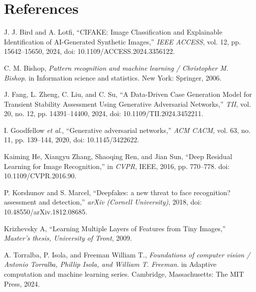 \documentclass{article}
\begin{document}
\section{References}
\begin{enumerate}[label={[\arabic*]}]
    \item J. J. Bird and A. Lotfi, “CIFAKE: Image Classification and Explainable Identification of AI-Generated Synthetic Images,” \textit{IEEE ACCESS}, vol. 12, pp. 15642–15650, 2024, doi: 10.1109/ACCESS.2024.3356122.
    \item C. M. Bishop, \textit{Pattern recognition and machine learning / Christopher M. Bishop}. in Information science and statistics. New York: Springer, 2006.
    \item J. Fang, L. Zheng, C. Liu, and C. Su, “A Data-Driven Case Generation Model for Transient Stability Assessment Using Generative Adversarial Networks,” \textit{TII}, vol. 20, no. 12, pp. 14391–14400, 2024, doi: 10.1109/TII.2024.3452211.
    \item I. Goodfellow \textit{et al}., “Generative adversarial networks,” \textit{ACM CACM}, vol. 63, no. 11, pp. 139–144, 2020, doi: 10.1145/3422622.
    \item Kaiming He, Xiangyu Zhang, Shaoqing Ren, and Jian Sun, “Deep Residual Learning for Image Recognition,” in \textit{CVPR}, IEEE, 2016, pp. 770–778. doi: 10.1109/CVPR.2016.90.
    \item P. Korshunov and S. Marcel, “Deepfakes: a new threat to face recognition? assessment and detection,” \textit{arXiv (Cornell University)}, 2018, doi: 10.48550/arXiv.1812.08685.
    \item Krizhevsky A, “Learning Multiple Layers of Features from Tiny Images,” \textit{Master’s thesis, University of Tront}, 2009.
    \item A. Torralba, P. Isola, and Freeman William T., \textit{Foundations of computer vision / Antonio Torralba, Phillip Isola, and William T. Freeman}. in Adaptive computation and machine learning series. Cambridge, Massachusetts: The MIT Press, 2024.
\end{enumerate}
\end{document}

